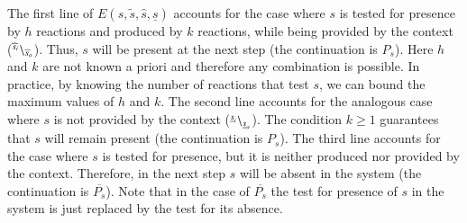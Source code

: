 The first line of $ E(s,\widetilde{s},\widehat{s},\underline{s})$ accounts for the case where $s$ is tested for presence by $h$ reactions and produced by $k$ reactions, while being provided by the context (${}^{\widehat{s}_i} \backslash_{\widehat{s}_o}$).
Thus, $s$ will be present at the next step (the continuation is $P_s$). Here $h$ and $k$ are not known a priori and therefore any
combination is possible. 
In practice, by knowing the number of reactions that test $s$, we can bound the maximum 
values of $h$ and $k$.
The second line accounts for the analogous case where $s$ is not provided by the context (${}^{\underline{s}_i} \backslash_{\underline{s}_o}$). 
The condition $k\geq 1$ guarantees that $s$ will remain present (the continuation is $P_s$).
The third line accounts for the case where $s$ is tested for presence, but it is neither produced nor provided by  the context. Therefore, in the next step $s$ will be absent in the system (the continuation is $\overline{P_s}$).
Note that in the case of $\overline{P_s}$ the test for presence of $s$ in the system is just replaced by the test for its absence.

